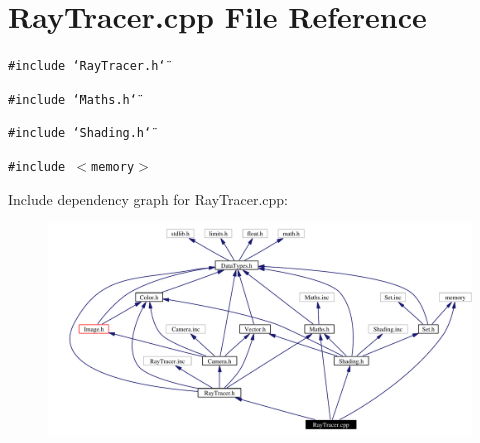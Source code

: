 \section{Ray\-Tracer.cpp File Reference}
\label{RayTracer_8cpp}
{\tt \#include \char`\"{}Ray\-Tracer.h\char`\"{}}\par
{\tt \#include \char`\"{}Maths.h\char`\"{}}\par
{\tt \#include \char`\"{}Shading.h\char`\"{}}\par
{\tt \#include $<$memory$>$}\par


Include dependency graph for Ray\-Tracer.cpp:\begin{figure}[H]
\begin{center}
\leavevmode
\includegraphics[width=363pt]{RayTracer_8cpp__incl}
\end{center}
\end{figure}
